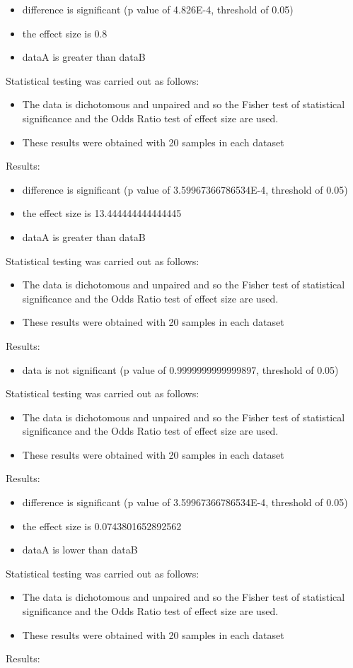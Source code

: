 \documentclass[]{article}
\begin{document}
\begin{itemize}
\item{difference is significant (p value of 4.826E-4, threshold of 0.05)}
\item{the effect size is 0.8}
\item{dataA is greater than dataB}
\end{itemize}Statistical testing was carried out as follows: \begin{itemize}
\item{The data is dichotomous and unpaired and so the Fisher test of statistical significance and the Odds Ratio test of effect size are used.}
\item{These results were obtained with 20 samples in each dataset}
\end{itemize}Results:
\begin{itemize}
\item{difference is significant (p value of 3.59967366786534E-4, threshold of 0.05)}
\item{the effect size is 13.444444444444445}
\item{dataA is greater than dataB}
\end{itemize}Statistical testing was carried out as follows: \begin{itemize}
\item{The data is dichotomous and unpaired and so the Fisher test of statistical significance and the Odds Ratio test of effect size are used.}
\item{These results were obtained with 20 samples in each dataset}
\end{itemize}Results:
\begin{itemize}
\item{data is not significant (p value of 0.9999999999999897, threshold of 0.05)}
\end{itemize}Statistical testing was carried out as follows: \begin{itemize}
\item{The data is dichotomous and unpaired and so the Fisher test of statistical significance and the Odds Ratio test of effect size are used.}
\item{These results were obtained with 20 samples in each dataset}
\end{itemize}Results:
\begin{itemize}
\item{difference is significant (p value of 3.59967366786534E-4, threshold of 0.05)}
\item{the effect size is 0.0743801652892562}
\item{dataA is lower than dataB}
\end{itemize}Statistical testing was carried out as follows: \begin{itemize}
\item{The data is dichotomous and unpaired and so the Fisher test of statistical significance and the Odds Ratio test of effect size are used.}
\item{These results were obtained with 20 samples in each dataset}
\end{itemize}Results:
\end{document}
